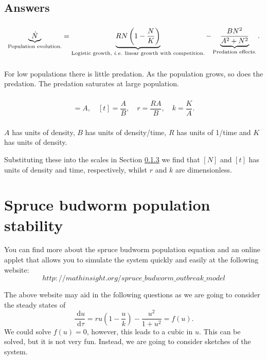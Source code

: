 \documentclass[]{article}
\newcommand{\bb}{\begin{equation}}
\newcommand{\ee}{\end{equation}}
\newcommand{\rd}{\text{ d}}
\newcommand{\sect}[1]{Section \ref{#1}}
\newcommand{\ie}{\emph{i.e.} }
\renewcommand{\l}{\left(}
\renewcommand{\r}{\right)}
\begin{document}
\begin{Answ}
\subsection{Answers}
\subsubsection{}
\bb
\underbrace{\dot{N}}_{\textrm{Population evolution.}}=\underbrace{RN\l 1-\frac{N}{K}\r}_{\textrm{Logistic growth, \ie linear growth with competition.}}-\underbrace{\frac{BN^2}{A^2+N^2}}_{\textrm{Predation effects.}}.
\ee
\subsubsection{}
For low populations there is little predation. As the population grows, so does the predation. The predation saturates at large population.
\subsubsection{}\label{Scales}
\bb
[N]=A,\quad [t]=\frac{A}{B},\quad r=\frac{RA}{B},\quad k=\frac{K}{A}.
\ee
\subsubsection{}
$A$ has units of density, $B$ has units of density/time, $R$ has units of 1/time and $K$ has units of density.

Substituting these into the scales in \sect{Scales} we find that $[N]$ and $[t]$ has units of density and time, respectively, whilst $r$ and $k$ are dimensionless.
\end{Answ}

\section{Spruce budworm population stability}
You can find more about the spruce budworm population equation and an online applet that allows you to simulate the system quickly and easily at the following website:
\bb
http://mathinsight.org/spruce\_budworm\_outbreak\_model
\ee

The above website may aid in the following questions as we are going to consider the steady states of
\bb
\frac{\rd u}{\rd \tau}=ru\l 1-\frac{u}{k}\r-\frac{u^2}{1+u^2}=f(u).\label{Spruce}
\ee
We could solve $f(u)=0$, however, this leads to a cubic in $u$. This can be solved, but it is not very fun. Instead, we are going to consider sketches of the system. 
\end{document}
